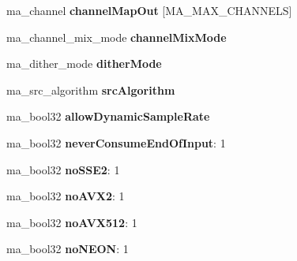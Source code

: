 \begin{DoxyCompactItemize}
ma\+\_\+channel {\bfseries channel\+Map\+Out} \mbox{[}M\+A\+\_\+\+M\+A\+X\+\_\+\+C\+H\+A\+N\+N\+E\+LS\mbox{]}
\item 
\mbox{\label{structma__pcm__converter__config_af2b7a532b860725ac4f670b02e1315e8}} 
ma\+\_\+channel\+\_\+mix\+\_\+mode {\bfseries channel\+Mix\+Mode}
\item 
\mbox{\label{structma__pcm__converter__config_a236c610b2dbb0077e8d880d123fc321e}} 
ma\+\_\+dither\+\_\+mode {\bfseries dither\+Mode}
\item 
\mbox{\label{structma__pcm__converter__config_a3d08cbbd7395241228e0daf281f8e256}} 
ma\+\_\+src\+\_\+algorithm {\bfseries src\+Algorithm}
\item 
\mbox{\label{structma__pcm__converter__config_af47d127c3bc75cc3c2dfcac0b8f2f77b}} 
ma\+\_\+bool32 {\bfseries allow\+Dynamic\+Sample\+Rate}
\item 
\mbox{\label{structma__pcm__converter__config_ad3482afe11a7ccd70eea763bc09285b8}} 
ma\+\_\+bool32 {\bfseries never\+Consume\+End\+Of\+Input}\+: 1
\item 
\mbox{\label{structma__pcm__converter__config_a1241ae4ee30efe0c51b623d81e651101}} 
ma\+\_\+bool32 {\bfseries no\+S\+S\+E2}\+: 1
\item 
\mbox{\label{structma__pcm__converter__config_ad56b27458bcde2ddee5b5a0fa85ae041}} 
ma\+\_\+bool32 {\bfseries no\+A\+V\+X2}\+: 1
\item 
\mbox{\label{structma__pcm__converter__config_a0a5418c2c05c20c4c20308b3178a3655}} 
ma\+\_\+bool32 {\bfseries no\+A\+V\+X512}\+: 1
\item 
\mbox{\label{structma__pcm__converter__config_a26cd8bf61a1f2ddea145a14a0e41ccd3}} 
ma\+\_\+bool32 {\bfseries no\+N\+E\+ON}\+: 1
\item 
\mbox{\label{structma__pcm__converter__config_a2692d9d8f8f0fef2c56a228aeded4d88}} 

\end{DoxyCompactItemize}
